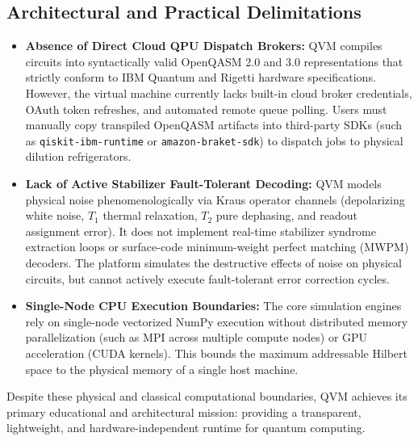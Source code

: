 \subsection{Architectural and Practical Delimitations}

\begin{itemize}[leftmargin=*]
    \item \textbf{Absence of Direct Cloud QPU Dispatch Brokers:} QVM compiles circuits into syntactically valid OpenQASM 2.0 and 3.0 representations that strictly conform to IBM Quantum and Rigetti hardware specifications. However, the virtual machine currently lacks built-in cloud broker credentials, OAuth token refreshes, and automated remote queue polling. Users must manually copy transpiled OpenQASM artifacts into third-party SDKs (such as \texttt{qiskit-ibm-runtime} or \texttt{amazon-braket-sdk}) to dispatch jobs to physical dilution refrigerators.
    \item \textbf{Lack of Active Stabilizer Fault-Tolerant Decoding:} QVM models physical noise phenomenologically via Kraus operator channels (depolarizing white noise, $T_1$ thermal relaxation, $T_2$ pure dephasing, and readout assignment error). It does not implement real-time stabilizer syndrome extraction loops or surface-code minimum-weight perfect matching (MWPM) decoders. The platform simulates the destructive effects of noise on physical circuits, but cannot actively execute fault-tolerant error correction cycles.
    \item \textbf{Single-Node CPU Execution Boundaries:} The core simulation engines rely on single-node vectorized NumPy execution without distributed memory parallelization (such as MPI across multiple compute nodes) or GPU acceleration (CUDA kernels). This bounds the maximum addressable Hilbert space to the physical memory of a single host machine.
\end{itemize}

Despite these physical and classical computational boundaries, QVM achieves its primary educational and architectural mission: providing a transparent, lightweight, and hardware-independent runtime for quantum computing.
